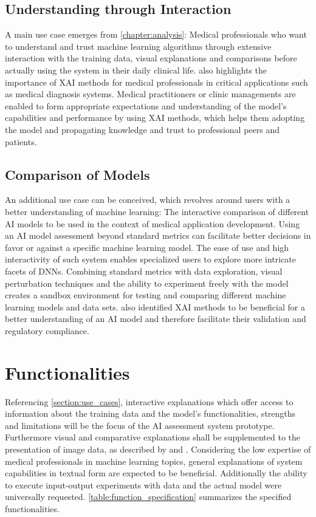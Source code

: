 \documentclass[11pt,a4paper,english]{scrreprt}
\begin{document}
\subsection{Understanding through Interaction}
A main use case emerges from \autoref{chapter:analysis}: Medical professionals who want to understand and trust machine learning algorithms through extensive interaction with the training data, visual explanations and comparisons before actually using the system in their daily clinical life. \textcite{meske_transparency_2020} also highlights the importance of XAI methods for medical professionals in critical applications such as medical diagnosis systems. Medical practitioners or clinic managements are enabled to form appropriate expectations and understanding of the model's capabilities and performance by using XAI methods, which helps them adopting the model and propagating knowledge and trust to professional peers and patients.

\subsection{Comparison of Models}
An additional use case can be conceived, which revolves around users with a better understanding of machine learning: The interactive comparison of different AI models to be used in the context of medical application development. Using an AI model assessment beyond standard metrics can facilitate better decisions in favor or against a specific machine learning model. The ease of use and high interactivity of such system enables specialized users to explore more intricate facets of DNNs. Combining standard metrics with data exploration, visual perturbation techniques and the ability to experiment freely with the model creates a sandbox environment for testing and comparing different machine learning models and data sets. \textcite{meske_transparency_2020} also identified XAI methods to be beneficial for a better understanding of an AI model and therefore facilitate their validation and regulatory compliance.

\section{Functionalities}\label{section:functionalities}
Referencing \autoref{section:use_cases}, interactive explanations which offer access to information about the training data and the model's functionalities, strengths and limitations will be the focus of the AI assessment system prototype. Furthermore visual and comparative explanations shall be supplemented to the presentation of image data, as described by \textcite{zeiler_visualizing_2013} and \textcite{cai_effects_2019}. Considering the low expertise of medical professionals in machine learning topics, general explanations of system capabilities in textual form are expected to be beneficial. Additionally the ability to execute input-output experiments with data and the actual model were universally requested. \autoref{table:function_specification} summarizes the specified functionalities. 
\end{document}
